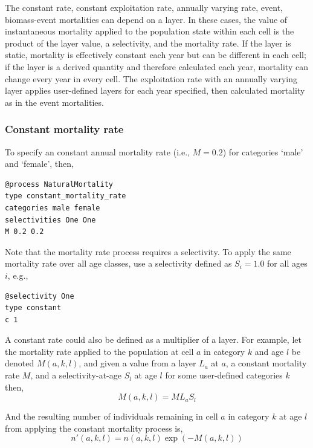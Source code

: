 The constant rate, constant exploitation rate, annually varying rate, event, biomass-event mortalities can depend on a layer. In these cases, the value of instantaneous mortality applied to the population state within each cell is the product of the layer value, a selectivity, and the mortality rate. If the layer is static, mortality is effectively constant each year but can be different in each cell; if the layer is a derived quantity and therefore calculated each year, mortality can change every year in every cell. The exploitation rate with an annually varying layer applies user-defined layers for each year specified, then calculated mortality as in the event mortalities.

\subsubsection*{Constant mortality rate}

To specify an constant annual mortality rate (i.e., $M=0.2$) for categories `male' and `female', then, 
{\small{\begin{verbatim}
@process NaturalMortality
type constant_mortality_rate
categories male female
selectivities One One
M 0.2 0.2
\end{verbatim}}}

Note that the mortality rate process requires a selectivity. To apply the same mortality rate over all age classes, use a selectivity defined as $S_i=1.0$ for all ages $i$, e.g.,
{\small{\begin{verbatim}
@selectivity One
type constant
c 1
\end{verbatim}}}

A constant rate could also be defined as a multiplier of a layer. For example, let the mortality rate applied to the population at cell $a$ in category $k$ and age $l$ be denoted $M(a,k,l)$, and given a value from a layer $L_a$  at $a$, a constant mortality rate $M$, and a selectivity-at-age $S_l$ at age $l$ for some user-defined categories $k$ then, 
\begin{equation}
  M(a,k,l) = ML_a S_l 
\end{equation}

And the resulting number of individuals remaining in cell $a$ in category $k$ at age $l$ from applying the constant mortality process is,
\begin{equation}
  n'(a,k,l) = n(a,k,l) \exp \left({-M(a,k,l)}\right)
\end{equation}

